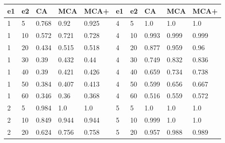 \begin{table}[H]
  \centering
  \begin{tabular}{|l|l|l|l|l|lllll}
    \hline
    e1 & e2 & CA    & MCA   & MCA+  & \multicolumn{1}{l|}{e1} & \multicolumn{1}{l|}{e2} & \multicolumn{1}{l|}{CA}    & \multicolumn{1}{l|}{MCA}   & \multicolumn{1}{l|}{MCA+}  \\ \hline
    1  & 5  & 0.768 & 0.92  & 0.925 & \multicolumn{1}{l|}{4}  & \multicolumn{1}{l|}{5}  & \multicolumn{1}{l|}{1.0}   & \multicolumn{1}{l|}{1.0}   & \multicolumn{1}{l|}{1.0}   \\ \hline
    1  & 10 & 0.572 & 0.721 & 0.728 & \multicolumn{1}{l|}{4}  & \multicolumn{1}{l|}{10} & \multicolumn{1}{l|}{0.993} & \multicolumn{1}{l|}{0.999} & \multicolumn{1}{l|}{0.999} \\ \hline
    1  & 20 & 0.434 & 0.515 & 0.518 & \multicolumn{1}{l|}{4}  & \multicolumn{1}{l|}{20} & \multicolumn{1}{l|}{0.877} & \multicolumn{1}{l|}{0.959} & \multicolumn{1}{l|}{0.96}  \\ \hline
    1  & 30 & 0.39  & 0.432 & 0.44  & \multicolumn{1}{l|}{4}  & \multicolumn{1}{l|}{30} & \multicolumn{1}{l|}{0.749} & \multicolumn{1}{l|}{0.832} & \multicolumn{1}{l|}{0.836} \\ \hline
    1  & 40 & 0.39  & 0.421 & 0.426 & \multicolumn{1}{l|}{4}  & \multicolumn{1}{l|}{40} & \multicolumn{1}{l|}{0.659} & \multicolumn{1}{l|}{0.734} & \multicolumn{1}{l|}{0.738} \\ \hline
    1  & 50 & 0.384 & 0.407 & 0.413 & \multicolumn{1}{l|}{4}  & \multicolumn{1}{l|}{50} & \multicolumn{1}{l|}{0.599} & \multicolumn{1}{l|}{0.656} & \multicolumn{1}{l|}{0.667} \\ \hline
    1  & 60 & 0.346 & 0.36  & 0.368 & \multicolumn{1}{l|}{4}  & \multicolumn{1}{l|}{60} & \multicolumn{1}{l|}{0.516} & \multicolumn{1}{l|}{0.559} & \multicolumn{1}{l|}{0.572} \\ \hline
    2  & 5  & 0.984 & 1.0   & 1.0   & \multicolumn{1}{l|}{5}  & \multicolumn{1}{l|}{5}  & \multicolumn{1}{l|}{1.0}   & \multicolumn{1}{l|}{1.0}   & \multicolumn{1}{l|}{1.0}   \\ \hline
    2  & 10 & 0.849 & 0.944 & 0.944 & \multicolumn{1}{l|}{5}  & \multicolumn{1}{l|}{10} & \multicolumn{1}{l|}{0.999} & \multicolumn{1}{l|}{1.0}   & \multicolumn{1}{l|}{1.0}   \\ \hline
    2  & 20 & 0.624 & 0.756 & 0.758 & \multicolumn{1}{l|}{5}  & \multicolumn{1}{l|}{20} & \multicolumn{1}{l|}{0.957} & \multicolumn{1}{l|}{0.988} & \multicolumn{1}{l|}{0.989} \\ \hline

\end{tabular}
\end{table}
